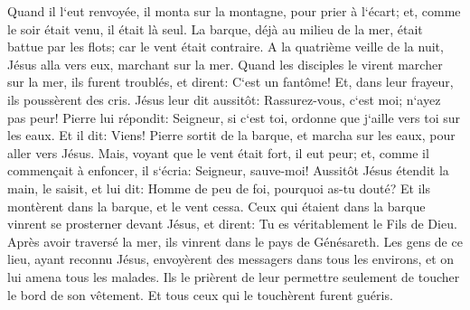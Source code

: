 \verse Quand il l`eut renvoyée, il monta sur la montagne, pour prier à l`écart; et, comme le soir était venu, il était là seul. 
\verse La barque, déjà au milieu de la mer, était battue par les flots; car le vent était contraire. 
\verse A la quatrième veille de la nuit, Jésus alla vers eux, marchant sur la mer. 
\verse Quand les disciples le virent marcher sur la mer, ils furent troublés, et dirent: C`est un fantôme! Et, dans leur frayeur, ils poussèrent des cris. 
\verse Jésus leur dit aussitôt: Rassurez-vous, c`est moi; n`ayez pas peur! 
\verse Pierre lui répondit: Seigneur, si c`est toi, ordonne que j`aille vers toi sur les eaux. 
\verse Et il dit: Viens! Pierre sortit de la barque, et marcha sur les eaux, pour aller vers Jésus. 
\verse Mais, voyant que le vent était fort, il eut peur; et, comme il commençait à enfoncer, il s`écria: Seigneur, sauve-moi! 
\verse Aussitôt Jésus étendit la main, le saisit, et lui dit: Homme de peu de foi, pourquoi as-tu douté? 
\verse Et ils montèrent dans la barque, et le vent cessa. 
\verse Ceux qui étaient dans la barque vinrent se prosterner devant Jésus, et dirent: Tu es véritablement le Fils de Dieu. 
\verse Après avoir traversé la mer, ils vinrent dans le pays de Génésareth. 
\verse Les gens de ce lieu, ayant reconnu Jésus, envoyèrent des messagers dans tous les environs, et on lui amena tous les malades. 
\verse Ils le prièrent de leur permettre seulement de toucher le bord de son vêtement. Et tous ceux qui le touchèrent furent guéris. 

